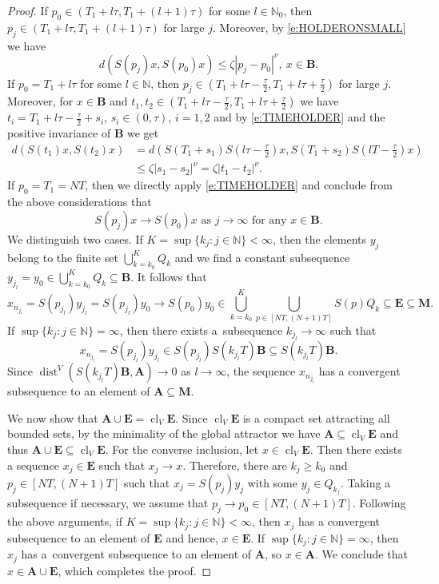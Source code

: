 \documentclass[a4paper,12pt,reqno]{amsart}
\theoremstyle{plain}
\theoremstyle{definition}
\numberwithin{equation}{section}
\newcommand{\N}{\mathbb{N}}
\newcommand{\abs}[1]{\left\vert#1\right\vert}
\newcommand{\dist}{\operatorname{dist}}
\newcommand{\cl}{\operatorname{cl}}
\renewcommand{\geq}{\geqslant}
\renewcommand{\leq}{\leqslant}
\begin{document}
\begin{proof}
If $p_0\in(T_1+l\tau,T_1+(l+1)\tau)$ for some $l\in\N_0$, then $p_j\in(T_1+l\tau,T_1+(l+1)\tau)$
for large $j$. Moreover, by \eqref{e:HOLDERONSMALL} we have
$$d(S(p_j)x,S(p_0)x)\leq\zeta\abs{p_j-p_0}^{\nu},\ x\in\mathbf{B}.$$
If $p_0=T_1+l\tau$ for some $l\in\N$, then $p_j\in(T_1+l\tau-\frac{\tau}{2},T_1+l\tau+\frac{\tau}{2})$
for large $j$. Moreover, for $x\in\mathbf{B}$ and $t_1,t_2\in(T_1+l\tau-\frac{\tau}{2},T_1+l\tau+\frac{\tau}{2})$
we have $t_i=T_1+l\tau-\frac{\tau}{2}+s_i$, $s_i\in(0,\tau)$, $i=1,2$ and by \eqref{e:TIMEHOLDER}
and the positive invariance of $\mathbf{B}$ we get
\begin{equation*}
\begin{split}
d(S(t_1)x,S(t_2)x)&=d(S(T_1+s_1)S(l\tau-\tfrac{\tau}{2})x,S(T_1+s_2)S(lT-\tfrac{\tau}{2})x)\\
&\leq\zeta\abs{s_1-s_2}^{\nu}=\zeta\abs{t_1-t_2}^{\nu}.
\end{split}
\end{equation*}
If $p_0=T_1=NT$, then we directly apply \eqref{e:TIMEHOLDER} and conclude from
the above considerations that
\begin{equation*}
S(p_j)x\to S(p_0)x\text{ as }j\to\infty\text{ for any }x\in\mathbf{B}.
\end{equation*}
We distinguish two cases.
If $K=\sup\{k_j\colon j\in\N\}<\infty$, then the elements $y_j$ belong to the finite set $\bigcup_{k=k_0}^{K}Q_k$
and we find a constant subsequence $y_{j_l}=y_0\in\bigcup_{k=k_0}^{K}Q_k\subseteq\mathbf{B}$.
It follows that 
$$x_{n_{j_l}}=S(p_{j_l})y_{j_l}=S(p_{j_l})y_0\to S(p_0)y_0\in\bigcup_{k=k_0}^{K}\bigcup_{p\in[NT,(N+1)T]}S(p)Q_k\subseteq\mathbf{E}\subseteq\mathbf{M}.$$
If $\sup\{k_j\colon j\in\N\}=\infty$, then there exists a~subsequence $k_{j_l}\to\infty$ such that
$$x_{n_{j_l}}=S(p_{j_l})y_{j_l}\in S(p_{j_l})S(k_{j_l}T)\mathbf{B}\subseteq S(k_{j_l}T)\mathbf{B}.$$
Since $\dist^{V}(S(k_{j_l}T)\mathbf{B},\mathbf{A})\to 0$ as $l\to\infty$, the sequence $x_{n_{j_l}}$
has a convergent subsequence to an element of $\mathbf{A}\subseteq\mathbf{M}$.

We now show that $\mathbf{A}\cup\mathbf{E}=\cl_{V}\mathbf{E}$.
Since $\cl_{V}\mathbf{E}$ is a compact set attracting all bounded sets, by
the minimality of the global attractor we have $\mathbf{A}\subseteq\cl_{V}\mathbf{E}$ and thus $\mathbf{A}\cup\mathbf{E}\subseteq\cl_{V}\mathbf{E}$.
For the converse inclusion, let $x\in\cl_{V}\mathbf{E}$. Then there exists a sequence
$x_j\in\mathbf{E}$ such that $x_j\to x$. Therefore, there are $k_j\geq k_0$
and $p_j\in[NT,(N+1)T]$ such that $x_j=S(p_j)y_j$ with some $y_j\in Q_{k_j}$.
Taking a subsequence if necessary, we assume that $p_j\to p_0\in[NT,(N+1)T]$.
Following the above arguments, if $K=\sup\{k_j\colon j\in\N\}<\infty$, then
$x_j$ has a convergent subsequence to an element of $\mathbf{E}$ and hence,  $x\in\mathbf{E}$.
If $\sup\{k_j\colon j\in\N\}=\infty$, then $x_j$ has a~convergent subsequence to an element
of $\mathbf{A}$, so $x\in\mathbf{A}$. We conclude that $x\in\mathbf{A}\cup\mathbf{E}$,
which completes the proof.
\end{proof}
\end{document}
